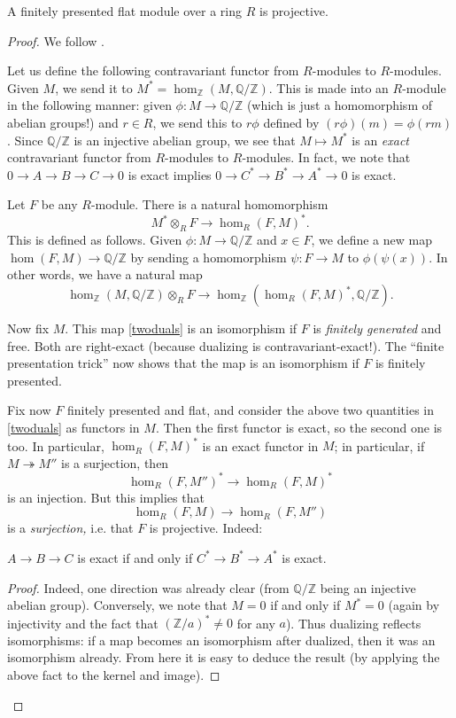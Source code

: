 \begin{theorem} 
A finitely presented flat module over a ring $R$ is projective.
\end{theorem} 
\begin{proof} 
We follow \cite{We95}.

Let us define the following contravariant functor from $R$-modules to $R$-modules.
Given $M$, we send it to $M^* = \hom_\mathbb{Z}(M, \mathbb{Q}/\mathbb{Z})$.
This is made into an $R$-module in the following manner: given $\phi: M \to
\mathbb{Q}/\mathbb{Z}$ (which is just a homomorphism of abelian groups!) and $r
\in R$, we send this to $r\phi$ defined by $(r\phi)(m) = \phi(rm)$.
Since $\mathbb{Q}/\mathbb{Z}$ is an injective abelian group, we see that $M
\mapsto M^*$ is an \emph{exact} contravariant functor from $R$-modules to
$R$-modules.
In fact, we note that $0 \to A \to B \to C \to 0$ is exact  implies $0 \to C^* \to B^* \to A^* \to 0$ is exact.

Let $F$ be any $R$-module. There is a natural homomorphism
\begin{equation} \label{twoduals} M^* \otimes_R F \to \hom_R(F, M)^*.
\end{equation}
This is defined as follows. Given $\phi: M \to \mathbb{Q}/\mathbb{Z}$ and $x \in
F$, we define a new map $\hom(F, M) \to \mathbb{Q}/\mathbb{Z}$ by sending a
homomorphism $\psi: F \to M$ to $\phi(\psi(x))$.
In other words, we have a natural map
\[ \hom_{\mathbb{Z}}(M, \mathbb{Q}/\mathbb{Z} ) \otimes_R F \to
\hom_{\mathbb{Z}}( \hom_R(F, M)^*, \mathbb{Q}/\mathbb{Z}). \]

Now fix $M$.
This map \eqref{twoduals} is an isomorphism if $F$ is \emph{finitely
generated} and  free. 
 Both are right-exact (because dualizing is contravariant-exact!).
The ``finite presentation trick'' now shows that the map is an isomorphism if
$F$ is finitely presented.
 
Fix now $F$  finitely presented and flat, and consider the above two quantities
in \eqref{twoduals} as functors in $M$.
Then the first functor is exact, so the second one is too.
In particular, $\hom_R(F, M)^*$ is an exact functor in $M$; in particular, if
$M \twoheadrightarrow M''$ is a surjection, then 
\[ \hom_R(F, M'')^* \to \hom_R(F, M)^*  \]
is an injection. But this implies that
\[ \hom_R(F, M) \to \hom_R(F, M'')  \]
is a \emph{surjection,} i.e. that $F$ is projective.
Indeed:
\begin{lemma} $ A \to B \to C $ is exact if and only if $C^* \to B^* \to A^* $ is exact.
\end{lemma} 
\begin{proof} 
Indeed, one direction was already clear (from $\mathbb{Q}/\mathbb{Z}$ being an
injective abelian group). 
Conversely, we note that $M = 0$ if and only if $M^* = 0$ (again by
injectivity and the fact that $(\mathbb{Z}/a)^* \neq 0$ for any $a$).
Thus dualizing reflects isomorphisms: if a map becomes an isomorphism after
dualized, then it was an isomorphism already. From here it is easy to deduce
the result (by applying the above fact to the kernel and image).
\end{proof} 
\end{proof} 
